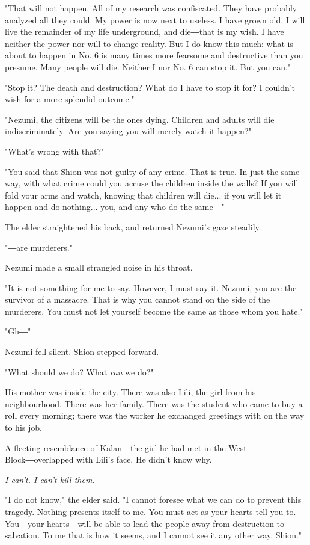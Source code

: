 "That will not happen. All of my research was confiscated. They have
probably analyzed all they could. My power is now next to useless. I
have grown old. I will live the remainder of my life underground, and
die―that is my wish. I have neither the power nor will to change
reality. But I do know this much: what is about to happen in No. 6 is
many times more fearsome and destructive than you presume. Many people
will die. Neither I nor No. 6 can stop it. But you can."

"Stop it? The death and destruction? What do I have to stop it for? I
couldn't wish for a more splendid outcome."

"Nezumi, the citizens will be the ones dying. Children and adults will
die indiscriminately. Are you saying you will merely watch it happen?"

"What's wrong with that?"

"You said that Shion was not guilty of any crime. That is true. In just
the same way, with what crime could you accuse the children inside the
walls? If you will fold your arms and watch, knowing that children will
die... if you will let it happen and do nothing... you, and any who do
the same―"

The elder straightened his back, and returned Nezumi's gaze steadily.

"―are murderers."

Nezumi made a small strangled noise in his throat.

"It is not something for me to say. However, I must say it. Nezumi, you
are the survivor of a massacre. That is why you cannot stand on the side
of the murderers. You must not let yourself become the same as those
whom you hate."

"Gh―"

Nezumi fell silent. Shion stepped forward.

"What should we do? What \emph{can} we do?"

His mother was inside the city. There was also Lili, the girl from his
neighbourhood. There was her family. There was the student who came to
buy a roll every morning; there was the worker he exchanged greetings
with on the way to his job.

A fleeting resemblance of Kalan―the girl he had met in the West
Block―overlapped with Lili's face. He didn't know why.

\emph{I can't. I can't kill them.}

"I do not know," the elder said. "I cannot foresee what we can do to
prevent this tragedy. Nothing presents itself to me. You must act as
your hearts tell you to. You―your hearts―will be able to lead the people
away from destruction to salvation. To me that is how it seems, and I
cannot see it any other way. Shion."


